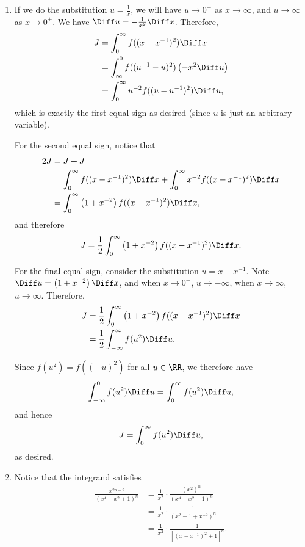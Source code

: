 \begin{enumerate}
    \item If we do the substitution \(u = \frac{1}{x}\), we will have \(u \to 0^{+}\) as \(x \to \infty\), and \(u \to \infty\) as \(x \to 0^{+}\). We have \(\Diff u = - \frac{1}{x^2} \Diff x\). Therefore,
          \begin{align*}
              J & = \int_{0}^{\infty} f((x - x^{-1})^2) \Diff x                    \\
                & = \int_{\infty}^{0} f((u^{-1} - u)^2) \left(- x^2 \Diff u\right) \\
                & = \int_{0}^{\infty} u^{-2} f((u - u^{-1})^2) \Diff u,
          \end{align*}
          which is exactly the first equal sign as desired (since \(u\) is just an arbitrary variable).

          For the second equal sign, notice that
          \begin{align*}
              2J & = J + J                                                                                            \\
                 & = \int_{0}^{\infty} f((x - x^{-1})^2) \Diff x + \int_{0}^{\infty} x^{-2} f((x - x^{-1})^2) \Diff x \\
                 & = \int_{0}^{\infty} \left(1 + x^{-2}\right) f((x - x^{-1})^2) \Diff x,
          \end{align*}
          and therefore
          \[
              J = \frac{1}{2} \int_{0}^{\infty} \left(1 + x^{-2}\right) f((x - x^{-1})^2) \Diff x.
          \]

          For the final equal sign, consider the substitution \(u = x - x^{-1}\). Note \(\Diff u = \left(1 + x^{-2}\right) \Diff x\), and when \(x \to 0^{+}\), \(u \to -\infty\), when \(x \to \infty\), \(u \to \infty\). Therefore,
          \begin{align*}
              J & = \frac{1}{2} \int_{0}^{\infty} \left(1 + x^{-2}\right) f((x - x^{-1})^2) \Diff x \\
                & = \frac{1}{2} \int_{-\infty}^{\infty} f(u^2) \Diff u.
          \end{align*}

          Since \(f(u^2) = f((-u)^2)\) for all \(u \in \RR\), we therefore have
          \[
              \int_{-\infty}^{0} f(u^2) \Diff u = \int_{0}^{\infty} f(u^2) \Diff u,
          \]
          and hence
          \[
              J = \int_{0}^{\infty} f(u^2) \Diff u,
          \]
          as desired.

    \item Notice that the integrand satisfies
          \begin{align*}
              \frac{x^{2n - 2}}{(x^4 - x^2 + 1)^n} & = \frac{1}{x^2} \cdot \frac{(x^2)^{n}}{(x^4 - x^2 + 1)^n} \\
                                                   & = \frac{1}{x^2} \cdot \frac{1}{(x^2 - 1 + x^{-2})^n}      \\
                                                   & = \frac{1}{x^2} \cdot \frac{1}{[(x - x^{-1})^2 + 1]^n}.
          \end{align*}


\end{enumerate}
